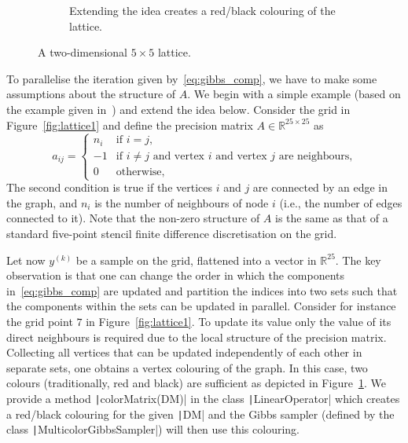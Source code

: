 \documentclass[
fontsize=11pt,
paper=a4,
numbers=noenddot
]{scrartcl}
\begin{document}
\begin{figure}
\begin{subfigure}[t]{.48\linewidth}
        \caption{Extending the idea creates a red/black colouring of the lattice.}\label{fig:lattice2}
    \end{subfigure}
    \caption{A two-dimensional $5 \times 5$ lattice.}\label{fig:lattice}
\end{figure}

To parallelise the iteration given by~\eqref{eq:gibbs_comp}, we have to make some assumptions about the structure of $A$. We begin with a simple example (based on the example given in~\cite*[Sec.~6.1]{foxparker}) and extend the idea below. Consider the grid in Figure~\ref{fig:lattice1} and define the precision matrix $A \in \mathbb{R}^{25 \times 25}$ as
\begin{equation*}
   a_{ij} = 
    \begin{cases}
        n_i & \text{if $i = j$,} \\
        -1 &  \text{if $i \neq j$ and vertex $i$ and vertex $j$ are neighbours,} \\
        0 & \text{otherwise,}
    \end{cases}
\end{equation*} 
The second condition is true if the vertices $i$ and $j$ are connected by an edge in the graph, and $n_i$ is the number of neighbours of node $i$ (i.e., the number of edges connected to it). Note that the non-zero structure of $A$ is the same as that of a standard five-point stencil finite difference discretisation on the grid.

Let now $y^{(k)}$ be a sample on the grid, flattened into a vector in $\mathbb{R}^{25}$. The key observation is that one can change the order in which the components in~\eqref{eq:gibbs_comp} are updated and partition the indices into two sets such that the components within the sets can be updated in parallel. Consider for instance the grid point $7$ in Figure~\ref{fig:lattice1}. To update its value only the value of its direct neighbours is required due to the local structure of the precision matrix. Collecting all vertices that can be updated independently of each other in separate sets, one obtains a vertex colouring of the graph. In this case, two colours (traditionally, red and black) are sufficient as depicted in Figure~\ref{fig:lattice2}. 
We provide a method \texttt|colorMatrix(DM)| in the class \texttt|LinearOperator| which creates a red/black colouring for the given \texttt|DM| and the Gibbs sampler (defined by the class \texttt|MulticolorGibbsSampler|) will then use this colouring.
\end{document}
